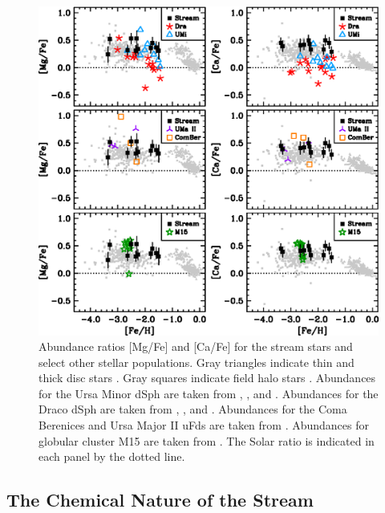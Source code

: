 \documentclass{emulateapj}
\begin{document}
\begin{figure}
\includegraphics[angle=0,width=7.0in]{fig14.eps}
\caption{
\label{detailplot1}
Abundance ratios [Mg/Fe] and [Ca/Fe] for the stream stars and
select other stellar populations.
Gray triangles indicate thin and thick disc stars \citep{reddy03,reddy06}.
Gray squares indicate field halo stars
\citep{cayrel04,barklem05,cohen08,lai08}.
Abundances for the Ursa Minor dSph are taken from
\citet{shetrone01}, \citet{sadakane04}, and \citet{aoki07}.
Abundances for the Draco dSph are taken from
\citet{shetrone01}, \citet{fulbright04}, and \citet{cohen09}.
Abundances for the Coma Berenices and Ursa Major II uFds are
taken from \citet{frebel09}.
Abundances for globular cluster M15 are taken from \citet{sobeck10}.
The Solar ratio is indicated in each panel by the dotted line.
}
\end{figure}


\subsection{The Chemical Nature of the Stream}
\label{nature}
\end{document}
